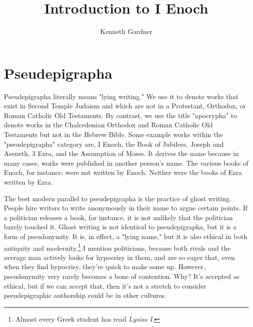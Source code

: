 \documentclass{article}
\title{Introduction to I Enoch}
\author{Kenneth Gardner}
\begin{document}
\maketitle

\section{Pseudepigrapha}

Pseudepigrapha literally means "lying writing."
We use it to denote works that exist in Second Temple Judaism and which are not in a Protestant, Orthodox, or Roman Catholic Old Testaments.
By contrast, we use the title "apocrypha" to denote works in the Chalcedonian Orthodox and Roman Catholic Old Testaments but not in the Hebrew Bible.
Some example works within the "pseudepigrapha" category are, I Enoch, the Book of Jubilees, Joseph and Aseneth, 3 Ezra, and the Assumption of Moses.
It derives the name because in many cases, works were published in another person's name.
The various books of Enoch, for instance, were not written by Enoch.
Neither were the books of Ezra written by Ezra.

The best modern parallel to pseudepigrapha is the practice of ghost writing.
People hire writers to write anonymously in their name to argue certain points.
If a politician releases a book, for instance, it is not unlikely that the politician barely touched it.
Ghost writing is not identical to pseudepigrapha, but it is a form of pseudonymity.
It is, in effect, a "lying name," but it is also ethical in both antiquity and modernity.\footnote{
  Almost every Greek student has read \emph{Lysias I}.
}
I mention politicians, because both rivals and the average man actively looks for hypocrisy in them, and are so eager that, even when they find hypocrisy, they're quick to make some up.
However, pseudonymity very rarely becomes a bone of contention.
Why?
It's accepted as ethical, but if we can accept that, then it's not a stretch to consider pseudepigraphic authorship could be in other cultures.
\end{document}
